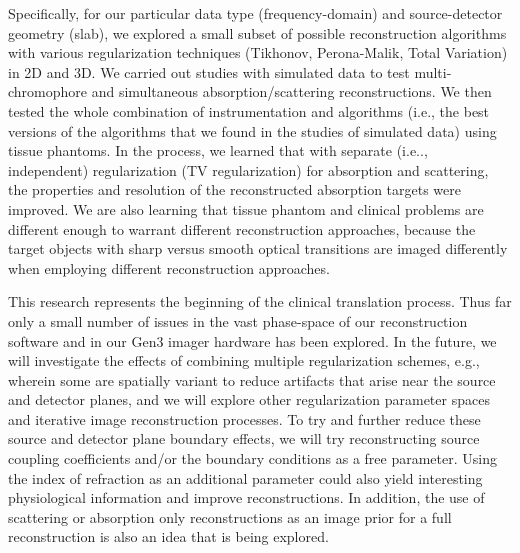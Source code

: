 Specifically, for our particular data type (frequency-domain) and source-detector geometry (slab), we explored a small subset of possible reconstruction algorithms with various regularization techniques (Tikhonov, Perona-Malik, Total Variation) in 2D and 3D. We carried out studies with simulated data to test multi-chromophore and simultaneous absorption/scattering reconstructions. We then tested the whole combination of instrumentation and algorithms (i.e., the best versions of the algorithms that we found in the studies of simulated data) using tissue phantoms. In the process, we learned that with separate (i.e.., independent) regularization (TV regularization) for absorption and scattering, the properties and resolution of the reconstructed absorption targets were improved. We are also learning that tissue phantom and clinical problems are different enough to warrant different reconstruction approaches, because the target objects with sharp versus smooth optical transitions are imaged differently when employing different reconstruction approaches. 

This research represents the beginning of the clinical translation process. Thus far only a small number of issues in the vast phase-space of our reconstruction software and in our Gen3 imager hardware has been explored. In the future, we will investigate the effects of combining multiple regularization schemes, e.g., wherein some are spatially variant to reduce artifacts that arise near the source and detector planes, and we will explore other regularization parameter spaces and iterative image reconstruction processes. To try and further reduce these source and detector plane boundary effects, we will try reconstructing source coupling coefficients and/or the boundary conditions as a free parameter. Using the index of refraction as an additional parameter could also yield interesting physiological information and improve reconstructions. In addition, the use of scattering or absorption only reconstructions as an image prior for a full reconstruction is also an idea that is being explored.


